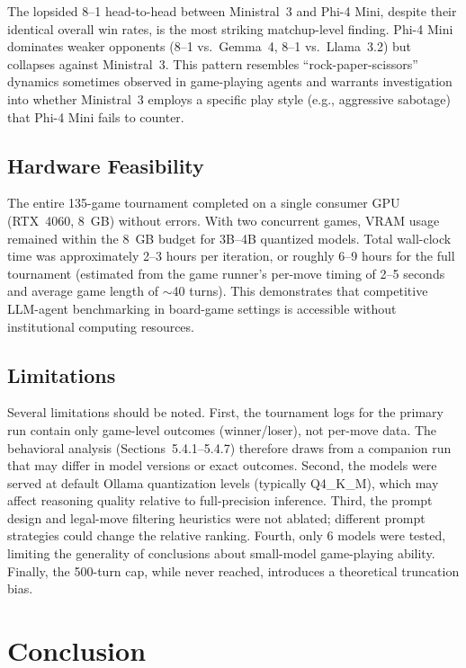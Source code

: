 \documentclass[11pt]{article}
\begin{document}
The lopsided 8--1 head-to-head between Ministral~3 and Phi-4 Mini, despite their identical overall win rates, is the most striking matchup-level finding. Phi-4 Mini dominates weaker opponents (8--1 vs.\ Gemma~4, 8--1 vs.\ Llama~3.2) but collapses against Ministral~3. This pattern resembles ``rock-paper-scissors'' dynamics sometimes observed in game-playing agents and warrants investigation into whether Ministral~3 employs a specific play style (e.g., aggressive sabotage) that Phi-4 Mini fails to counter.

\subsection{Hardware Feasibility}

The entire 135-game tournament completed on a single consumer GPU (RTX~4060, 8~GB) without errors. With two concurrent games, VRAM usage remained within the 8~GB budget for 3B--4B quantized models. Total wall-clock time was approximately 2--3 hours per iteration, or roughly 6--9 hours for the full tournament (estimated from the game runner's per-move timing of 2--5 seconds and average game length of $\sim$40 turns). This demonstrates that competitive LLM-agent benchmarking in board-game settings is accessible without institutional computing resources.

\subsection{Limitations}

Several limitations should be noted. First, the tournament logs for the primary run contain only game-level outcomes (winner/loser), not per-move data. The behavioral analysis (Sections~5.4.1--5.4.7) therefore draws from a companion run that may differ in model versions or exact outcomes. Second, the models were served at default Ollama quantization levels (typically Q4\_K\_M), which may affect reasoning quality relative to full-precision inference. Third, the prompt design and legal-move filtering heuristics were not ablated; different prompt strategies could change the relative ranking. Fourth, only 6 models were tested, limiting the generality of conclusions about small-model game-playing ability. Finally, the 500-turn cap, while never reached, introduces a theoretical truncation bias.

\section{Conclusion}
\end{document}
